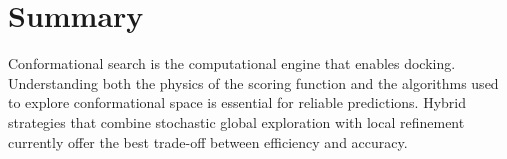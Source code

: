 \documentclass[12pt]{article}
\begin{document}
\section{Summary}
Conformational search is the computational engine that enables docking. Understanding both the physics of the scoring function and the algorithms used to explore conformational space is essential for reliable predictions. Hybrid strategies that combine stochastic global exploration with local refinement currently offer the best trade-off between efficiency and accuracy.



\end{document}
